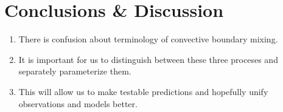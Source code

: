 \section{Conclusions \& Discussion}
\label{sec:conclusions}

\begin{enumerate}
\item There is confusion about terminology of convective boundary mixing.
\item It is important for us to distinguish between these three proceses and separately parameterize them.
\item This will allow us to make testable predictions and hopefully unify observations and models better.
\end{enumerate}
